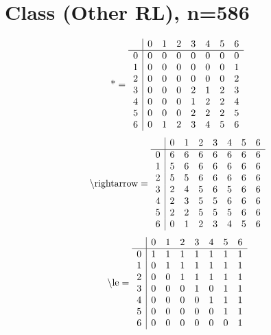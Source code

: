 \documentclass[11pt]{article}
\begin{document}
\section{Class (Other RL), n=586}
\[\text{*} = 
\begin{array}{r | r r r r r r r}
 & 0 & 1 & 2 & 3 & 4 & 5 & 6 \\ \hline
0 & 0 & 0 & 0 & 0 & 0 & 0 & 0 \\
1 & 0 & 0 & 0 & 0 & 0 & 0 & 1 \\
2 & 0 & 0 & 0 & 0 & 0 & 0 & 2 \\
3 & 0 & 0 & 0 & 2 & 1 & 2 & 3 \\
4 & 0 & 0 & 0 & 1 & 2 & 2 & 4 \\
5 & 0 & 0 & 0 & 2 & 2 & 2 & 5 \\
6 & 0 & 1 & 2 & 3 & 4 & 5 & 6 \\
\end{array}
\]
\[\text{\textbackslash rightarrow} = 
\begin{array}{r | r r r r r r r}
 & 0 & 1 & 2 & 3 & 4 & 5 & 6 \\ \hline
0 & 6 & 6 & 6 & 6 & 6 & 6 & 6 \\
1 & 5 & 6 & 6 & 6 & 6 & 6 & 6 \\
2 & 5 & 5 & 6 & 6 & 6 & 6 & 6 \\
3 & 2 & 4 & 5 & 6 & 5 & 6 & 6 \\
4 & 2 & 3 & 5 & 5 & 6 & 6 & 6 \\
5 & 2 & 2 & 5 & 5 & 5 & 6 & 6 \\
6 & 0 & 1 & 2 & 3 & 4 & 5 & 6 \\
\end{array}
\]
\[\text{\textbackslash le} = 
\begin{array}{r | r r r r r r r}
 & 0 & 1 & 2 & 3 & 4 & 5 & 6 \\ \hline
0 & 1 & 1 & 1 & 1 & 1 & 1 & 1 \\
1 & 0 & 1 & 1 & 1 & 1 & 1 & 1 \\
2 & 0 & 0 & 1 & 1 & 1 & 1 & 1 \\
3 & 0 & 0 & 0 & 1 & 0 & 1 & 1 \\
4 & 0 & 0 & 0 & 0 & 1 & 1 & 1 \\
5 & 0 & 0 & 0 & 0 & 0 & 1 & 1 \\
6 & 0 & 0 & 0 & 0 & 0 & 0 & 1 \\
\end{array}
\]
\end{document}
